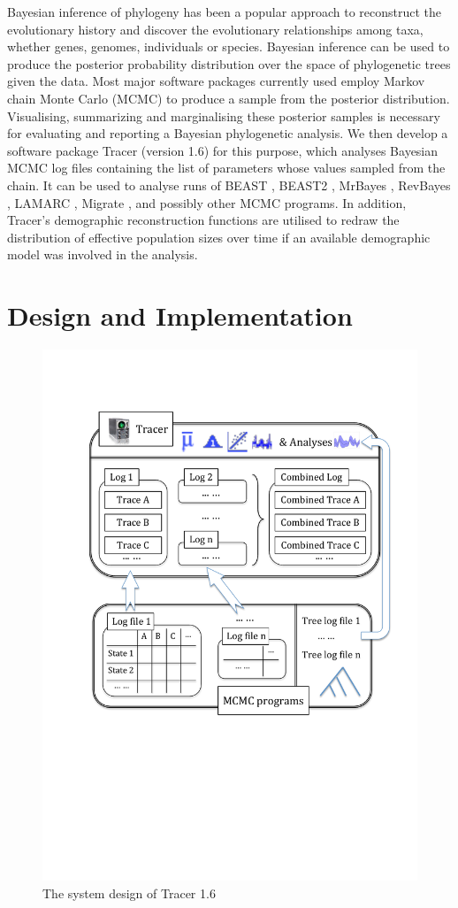 \documentclass{bioinfo}
\begin{document}
Bayesian inference of phylogeny \citep{huelsenbeck2001bayesian, yang2006computational, DrummondBouckaert2015} has been a popular approach to reconstruct the evolutionary history and discover the evolutionary relationships among taxa, whether genes, genomes, individuals or species.
Bayesian inference can be used to produce the posterior probability distribution over the space of phylogenetic trees given the data. Most major software packages currently used employ Markov chain Monte Carlo (MCMC) to produce a sample from the posterior distribution.
Visualising, summarizing and marginalising these posterior samples is necessary for evaluating and reporting a Bayesian phylogenetic analysis.
We then develop a software package Tracer (version 1.6) for this purpose, which analyses Bayesian MCMC log files containing the list of parameters whose values sampled from the chain.
It can be used to analyse runs of BEAST \citep{drummond2007beast,drummond2012bayesian}, BEAST2 \citep{bouckaert2014beast2}, MrBayes \citep{ronquist2012mrbayes}, RevBayes \citep{hohna2016revbayes}, LAMARC \citep{kuhner2006lamarc}, Migrate \citep{beerli2006comparison},  and possibly other MCMC programs.
In addition, Tracer's demographic reconstruction functions are utilised to redraw the distribution of effective population sizes over time if an available demographic model was involved in the analysis.



\section*{Design and Implementation}

\begin{figure}[ht]
\includegraphics[width=.38\textwidth]{./figures/tracer.pdf}
\caption{The system design of Tracer 1.6}
\label{fig:tracer}
\end{figure}
\end{document}
